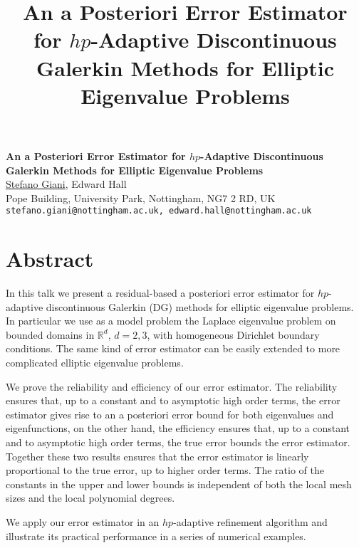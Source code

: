 \title{An a Posteriori Error Estimator for $hp$-Adaptive Discontinuous Galerkin Methods for Elliptic Eigenvalue Problems}
\author{} \institute{}

\begin{center}

\textbf{\Large An a Posteriori Error Estimator for $hp$-Adaptive Discontinuous Galerkin Methods for Elliptic Eigenvalue Problems}\\
\vspace{10mm}
{\large \underline {Stefano Giani}, Edward Hall}\\
Pope Building, University Park, Nottingham, NG7 2 RD, UK\\
{\tt stefano.giani@nottingham.ac.uk, edward.hall@nottingham.ac.uk}

\end{center}

\section*{Abstract}

In this talk we present a residual-based a posteriori error estimator for $hp$-adaptive discontinuous Galerkin (DG) methods for elliptic eigenvalue problems. In particular we use as a model problem the Laplace eigenvalue problem on bounded domains in $\mathbb{R}^d$, $d=2,3$, with homogeneous Dirichlet boundary conditions. The same kind of error estimator can be easily extended to more complicated elliptic eigenvalue problems.

We prove the reliability and efficiency of our error estimator. The reliability ensures that,  up to a constant and to asymptotic high order terms, the error estimator gives rise to an a posteriori error bound for both eigenvalues and eigenfunctions, on the other hand, the efficiency ensures that, up to a constant and to asymptotic high order terms, the true error bounds the error estimator. Together these two results ensures that the error estimator is linearly proportional to the true error, up to higher order terms. The ratio of the constants in the upper and lower bounds is independent of both the local mesh sizes and the local polynomial degrees. 

We apply our error estimator in an $hp$-adaptive refinement algorithm and illustrate its practical performance in a series of numerical examples. 

